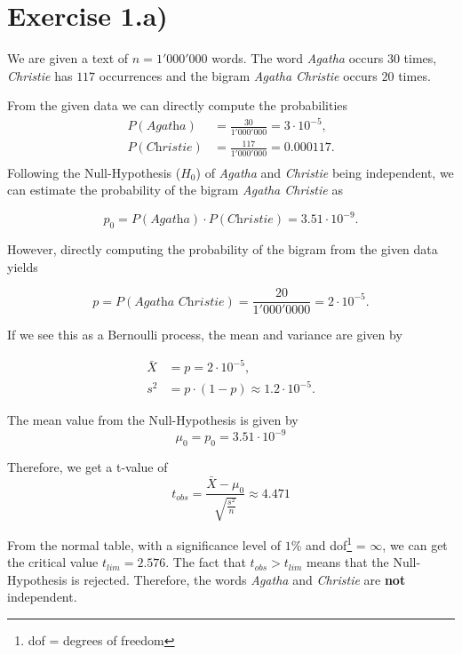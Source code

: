 \documentclass[a4paper]{article}
\begin{document}
\section*{Exercise 1.a)}
We are given a text of $n = 1'000'000$ words. The word \textit{Agatha} occurs $30$ times, \textit{Christie} has $117$ occurrences and the bigram \textit{Agatha Christie} occurs $20$ times.

\vspace{5mm}
\noindent From the given data we can directly compute the probabilities
\begin{align*}
P(\textit{Agatha}) &= \frac{30}{1'000'000} = 3 \cdot 10^{-5}, \\
P(\textit{Christie}) &= \frac{117}{1'000'000} = 0.000117. \\
\end{align*}
Following the Null-Hypothesis ($H_0$) of \textit{Agatha} and \textit{Christie} being independent, we can estimate the probability of the bigram \textit{Agatha Christie} as 

$$p_0 = P(\textit{Agatha}) \cdot P(\textit{Christie}) = 3.51 \cdot 10^{-9}.$$

\noindent However, directly computing the probability of the bigram from the given data yields

$$p = P(\textit{Agatha Christie}) = \frac{20}{1'000'0000} = 2 \cdot 10^{-5}.$$

\noindent If we see this as a Bernoulli process, the mean and variance are given by

\begin{align*}
\bar{X} &= p = 2 \cdot 10^{-5}, \\
s^2 &= p \cdot (1-p) \approx 1.2 \cdot 10^{-5}.
\end{align*}

\noindent The mean value from the Null-Hypothesis is given by 
$$ \mu_0 = p_0 = 3.51 \cdot 10^{-9}$$

\noindent Therefore, we get a t-value of 
$$t_{obs} = \frac{\bar{X} - \mu_0}{\sqrt{\frac{s^2}{n}}} \approx 4.471 $$


\noindent From the normal table, with a significance level of $1\%$ and dof\footnote{dof = degrees of freedom} = $\infty$, we can get the critical value $t_{lim} = 2.576$. The fact that $t_{obs} > t_{lim}$ means that the Null-Hypothesis is rejected. Therefore, the words \textit{Agatha} and \textit{Christie} are \textbf{not} independent.
\end{document}
